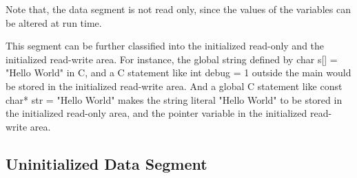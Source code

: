 \documentclass[a5paper,pagesize,10pt,bibtotoc,pointlessnumbers,
normalheadings,DIV=9,twoside=false]{scrbook}
\begin{document}
Note that, the data segment is not read only, since the values of the variables can be altered 
at run time.

This segment can be further classified into the initialized read-only and the initialized
read-write area.
For instance, the global string defined by char s[] = "Hello World" in C, and a C statement like 
int debug = 1 outside the main would be stored in the initialized read-write area.
And a global C statement like const char* str = "Hello World" makes the string literal "Hello World" 
to be stored in the initialized read-only area, and the pointer variable in the initialized 
read-write area.  

\subsection{Uninitialized Data Segment}

\end{document}

